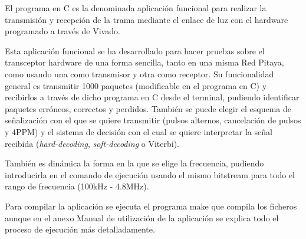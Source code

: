 El programa en C es la denominada aplicación funcional para realizar la transmisión y 
recepción de la trama mediante el enlace de luz con el hardware programado a través
de Vivado.

Esta aplicación funcional se ha desarrollado para hacer pruebas sobre el transceptor 
hardware de una forma sencilla, tanto en una misma Red Pitaya, como usando una como 
transmisor y otra como receptor. Su funcionalidad general es transmitir 1000 paquetes 
(modificable en el programa en C) y recibirlos a través de dicho programa en C desde 
el terminal, pudiendo identificar paquetes erróneos,
correctos y perdidos. También se puede elegir el esquema de señalización con el que se 
quiere transmitir (pulsos alternos, cancelación de pulsos y 4PPM) y el sistema de decisión
con el cual se quiere interpretar la señal recibida (\textit{hard-decoding}, 
\textit{soft-decoding} o Viterbi).

También es dinámica la forma en la que se elige la frecuencia, pudiendo 
introducirla en el comando de ejecución usando el mismo bitstream para todo el rango de 
frecuencia (100kHz - 4.8MHz).

Para compilar la aplicación se ejecuta el programa make que compila los ficheros aunque
en el anexo Manual de utilización de la aplicación se explica todo el proceso de ejecución
más detalladamente.

\chapterend{}